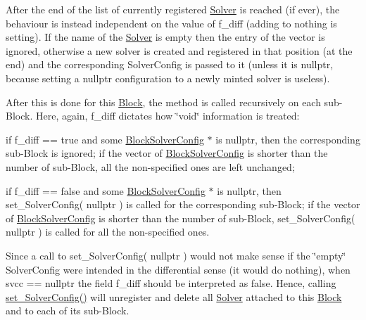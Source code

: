 \begin{DoxyItemize}
\begin{DoxyItemize}
\end{DoxyItemize}
\item After the end of the list of currently registered \mbox{\hyperlink{class_s_m_spp__di__unipi__it_1_1_solver}{Solver}} is reached (if ever), the behaviour is instead independent on the value of f\+\_\+diff (adding to nothing is setting). If the name of the \mbox{\hyperlink{class_s_m_spp__di__unipi__it_1_1_solver}{Solver}} is empty then the entry of the vector is ignored, otherwise a new solver is created and registered in that position (at the end) and the corresponding Solver\+Config is passed to it (unless it is nullptr, because setting a nullptr configuration to a newly minted solver is useless).
\end{DoxyItemize}

After this is done for this \mbox{\hyperlink{class_s_m_spp__di__unipi__it_1_1_block}{Block}}, the method is called recursively on each sub-\/\+Block. Here, again, f\+\_\+diff dictates how \char`\"{}void\char`\"{} information is treated\+:


\begin{DoxyItemize}
\item if f\+\_\+diff == true and some \mbox{\hyperlink{class_s_m_spp__di__unipi__it_1_1_block_solver_config}{Block\+Solver\+Config}} $\ast$ is nullptr, then the corresponding sub-\/\+Block is ignored; if the vector of \mbox{\hyperlink{class_s_m_spp__di__unipi__it_1_1_block_solver_config}{Block\+Solver\+Config}} is shorter than the number of sub-\/\+Block, all the non-\/specified ones are left unchanged;
\item if f\+\_\+diff == false and some \mbox{\hyperlink{class_s_m_spp__di__unipi__it_1_1_block_solver_config}{Block\+Solver\+Config}} $\ast$ is nullptr, then set\+\_\+\+Solver\+Config( nullptr ) is called for the corresponding sub-\/\+Block; if the vector of \mbox{\hyperlink{class_s_m_spp__di__unipi__it_1_1_block_solver_config}{Block\+Solver\+Config}} is shorter than the number of sub-\/\+Block, set\+\_\+\+Solver\+Config( nullptr ) is called for all the non-\/specified ones.
\end{DoxyItemize}

Since a call to set\+\_\+\+Solver\+Config( nullptr ) would not make sense if the \char`\"{}empty\char`\"{} Solver\+Config were intended in the differential sense (it would do nothing), when svcc == nullptr the field f\+\_\+diff should be interpreted as false. Hence, calling \mbox{\hyperlink{class_s_m_spp__di__unipi__it_1_1_block_a40a2bbe11fbdf470e474f6638fefa66f}{set\+\_\+\+Solver\+Config()}} will unregister and delete all \mbox{\hyperlink{class_s_m_spp__di__unipi__it_1_1_solver}{Solver}} attached to this \mbox{\hyperlink{class_s_m_spp__di__unipi__it_1_1_block}{Block}} and to each of its sub-\/\+Block.


